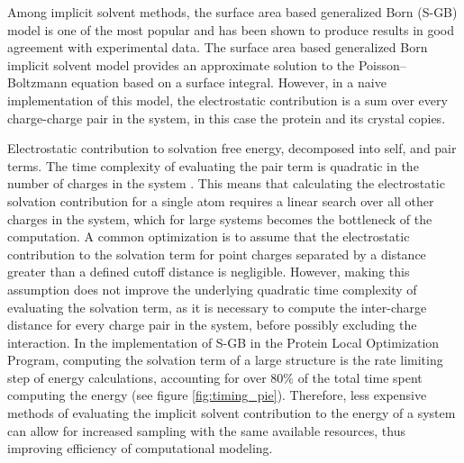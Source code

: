Among implicit solvent methods, the surface area based generalized Born (S-GB) model is one of the most popular and has been shown to produce results in good agreement with experimental data\cite{zhang2001solvent,gallicchio2002sgb}.
The surface area based generalized Born implicit solvent model provides an approximate solution to the Poisson--Boltzmann equation based on a surface integral\cite{ghosh1998generalized}.
However, in a naive implementation of this model, the electrostatic contribution is a sum over every charge-charge pair in the system, in this case the protein and its crystal copies.

Electrostatic contribution to solvation free energy, decomposed into self, and pair terms.  The time complexity of evaluating the pair term is quadratic in the number of charges in the system \cite{ghosh1998generalized}.
This means that calculating the electrostatic solvation contribution for a single atom requires a linear search over all other charges in the system, which for large systems becomes the bottleneck of the computation.
A common optimization is to assume that the electrostatic contribution to the solvation term for point charges separated by a distance greater than a defined cutoff distance is negligible\cite{gallicchio2004agbnp}. 
However, making this assumption does not improve the underlying quadratic time complexity of evaluating the solvation term, as it is necessary to compute the inter-charge distance for every charge pair in the system, before possibly excluding the interaction.
In the implementation of S-GB in the Protein Local Optimization Program, computing the solvation term of a large structure is the rate limiting step of energy calculations, accounting for over 80\% of the total time spent computing the energy (see figure \ref{fig:timing_pie}).
Therefore, less expensive methods of evaluating the implicit solvent contribution to the energy of a system can allow for increased sampling with the same available resources, thus improving efficiency of computational modeling. 

